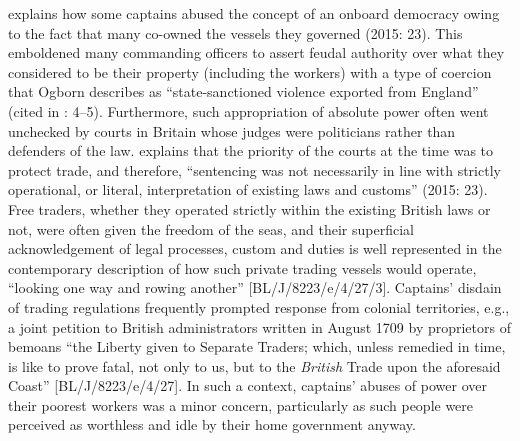 \citeauthor{Fusaro2015} explains how some captains abused the concept of an onboard democracy owing to the fact that many co-owned the vessels they governed (2015: 23). This emboldened many commanding officers to assert feudal authority over what they considered to be their property (including the workers) with a type of coercion that Ogborn describes as “state-sanctioned violence exported from England” (cited in \citealt{Fury2015}: 4–5). Furthermore, such appropriation of absolute power often went unchecked by courts in Britain whose judges were politicians rather than defenders of the law. \citeauthor{Fusaro2015} explains that the priority of the courts at the time was to protect trade, and therefore, “sentencing was not necessarily in line with strictly operational, or literal, interpretation of existing laws and customs” (2015: 23). Free traders, whether they operated strictly within the existing British laws or not, were often given the freedom of the seas, and their superficial acknowledgement of legal processes, custom and duties is well represented in the contemporary description of how such private trading vessels would operate, “looking one way and rowing another” [BL/J/8223/e/4/27/3]. Captains’ disdain of trading regulations frequently prompted response from colonial territories, e.g., a joint petition to British administrators written in {August 1709} by proprietors of  bemoans “the Liberty given to Separate Traders; which, unless remedied in time, is like to prove fatal, not only to us, but to the \textit{British} Trade upon the aforesaid Coast” [BL/J/8223/e/4/27]. In such a context, captains’ abuses of power over their poorest workers was a minor concern, particularly as such people were perceived as worthless and idle by their home government anyway. 

